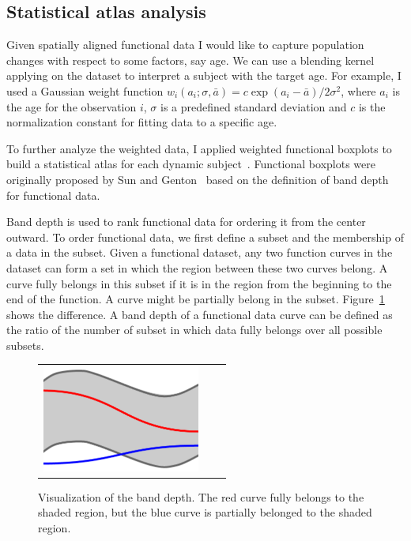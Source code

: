 \subsection{Statistical atlas analysis}
\label{sec:statical_atlas_analysis}
Given spatially aligned functional data I would like to capture population changes with respect to some factors, say age.
We can use a blending kernel applying on the dataset to interpret a subject with the target age.
For example, I used a Gaussian weight function $w_i(a_i; \sigma, \bar{a}) = c\exp{(a_i-\bar{a})/2\sigma^2}$, where $a_i$ is the age for the observation $i$, $\sigma$ is a predefined standard deviation and $c$ is the normalization constant for fitting data to a specific age.

To further analyze the weighted data, I applied weighted functional boxplots to build a statistical atlas for each dynamic subject~\cite{hong2013weighted}.
Functional boxplots were originally proposed by Sun and Genton~\cite{sun2011functional} based on the definition of band depth for functional data.

Band depth is used to rank functional data for ordering it from the center outward.
To order functional data, we first define a subset and the membership of a data in the subset.
Given a functional dataset, any two function curves in the dataset can form a set in which the region between these two curves belong.
A curve fully belongs in this subset if it is in the region from the beginning to the end of the function.
A curve might be partially belong in the subset.
Figure~\ref{fig:vis_fbplot} shows the difference.
A band depth of a functional data curve can be defined as the ratio of the number of subset in which data fully belongs over all possible subsets.

\begin{figure}[tb]
  \begin{center}
    \begin{tabular}{ccc}
    \includegraphics[height=35mm] {fig/illustration_fbplots.png}
    \end{tabular}
    \caption{ \label{fig:vis_fbplot} Visualization of the band depth. The red curve fully belongs to the shaded region, but the blue curve is partially belonged to the shaded region.
    }
  \end{center}
\end{figure}

